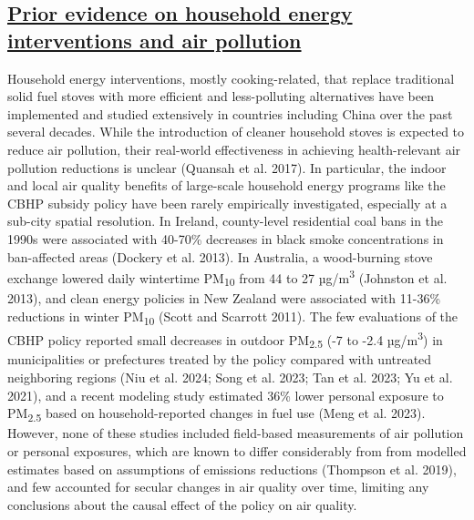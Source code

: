 \documentclass[
  letterpaper,
  DIV=11,
  numbers=noendperiod]{scrartcl}
\providecommand{\DIFadd}[1]{{\protect\color{blue}\underline{#1}}} %
\providecommand{\DIFaddbegin}{} %
\providecommand{\DIFaddend}{} %
\providecommand{\DIFdelbegin}{} %
\providecommand{\DIFdelend}{} %
\newcommand{\DIFscaledelfig}{0.5}
\newlength{\DIFdelgraphicswidth} %
\newlength{\DIFdelgraphicsheight} %
\newcommand{\DIFaddincludegraphics}[2][]{{\color{blue}\fbox{\DIFOincludegraphics[#1]{#2}}}} %
\newcommand{\DIFdelincludegraphics}[2][]{%
\sbox{\DIFdelgraphicsbox}{\DIFOincludegraphics[#1]{#2}}%
\settoboxwidth{\DIFdelgraphicswidth}{\DIFdelgraphicsbox} %
\settoboxtotalheight{\DIFdelgraphicsheight}{\DIFdelgraphicsbox} %
\scalebox{\DIFscaledelfig}{%
\parbox[b]{\DIFdelgraphicswidth}{\usebox{\DIFdelgraphicsbox}\\[-\baselineskip] \rule{\DIFdelgraphicswidth}{0em}}\llap{\resizebox{\DIFdelgraphicswidth}{\DIFdelgraphicsheight}{%
\setlength{\unitlength}{\DIFdelgraphicswidth}%
\begin{picture}(1,1)%
\thicklines\linethickness{2pt} %
{\color[rgb]{1,0,0}\put(0,0){\framebox(1,1){}}}%
{\color[rgb]{1,0,0}\put(0,0){\line( 1,1){1}}}%
{\color[rgb]{1,0,0}\put(0,1){\line(1,-1){1}}}%
\end{picture}%
}\hspace*{3pt}}} %
} %
\DeclareRobustCommand{\DIFaddbegin}{\DIFOaddbegin \let\includegraphics\DIFaddincludegraphics} %
\DeclareRobustCommand{\DIFaddend}{\DIFOaddend \let\includegraphics\DIFOincludegraphics} %
\DeclareRobustCommand{\DIFdelbegin}{\DIFOdelbegin \let\includegraphics\DIFdelincludegraphics} %
\DeclareRobustCommand{\DIFdelend}{\DIFOaddend \let\includegraphics\DIFOincludegraphics} %
\begin{document}
\DIFdelbegin %
\DIFdelend \DIFaddbegin \subsection{\DIFadd{Prior evidence on household energy interventions and air
pollution}}\label{prior-evidence-on-household-energy-interventions-and-air-pollution}
\DIFaddend 

Household energy interventions, mostly cooking-related, that replace
traditional solid fuel stoves with more efficient and less-polluting
alternatives have been implemented and studied extensively in countries
including China over the past several decades. While the introduction of
cleaner household stoves is expected to reduce air pollution, their
real-world effectiveness in achieving health-relevant air pollution
reductions is unclear (Quansah et al. 2017). In particular, the indoor
and local air quality benefits of large-scale household energy programs
like the CBHP subsidy policy have been rarely empirically investigated,
especially at a sub-city spatial resolution. In Ireland, county-level
residential coal bans in the 1990s were associated with 40-70\%
decreases in black smoke concentrations in ban-affected areas (Dockery
et al. 2013). In Australia, a wood-burning stove exchange lowered daily
wintertime PM\textsubscript{10} from 44 to 27 µg/m\textsuperscript{3}
(Johnston et al. 2013), and clean energy policies in New Zealand were
associated with 11-36\% reductions in winter PM\textsubscript{10} (Scott
and Scarrott 2011). The few evaluations of the CBHP policy reported
small decreases in outdoor PM\textsubscript{2.5} (-7 to -2.4
µg/m\textsuperscript{3}) in municipalities or prefectures treated by the
policy compared with untreated neighboring regions (Niu et al. 2024;
Song et al. 2023; Tan et al. 2023; Yu et al. 2021), and a recent
modeling study estimated 36\% lower personal exposure to
PM\textsubscript{2.5} based on household-reported changes in fuel use
(Meng et al. 2023). However, none of these studies included field-based
measurements of air pollution or personal exposures, which are known to
differ considerably from from modelled estimates based on assumptions of
emissions reductions (Thompson et al. 2019), and few accounted for
secular changes in air quality over time, limiting any conclusions about
the causal effect of the policy on air quality.
\end{document}
